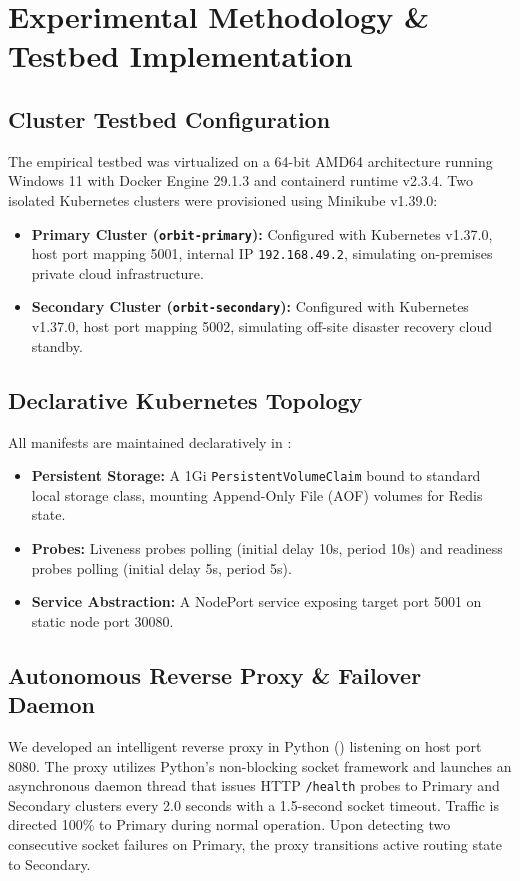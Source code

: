 \documentclass[conference]{IEEEtran}
\begin{document}
\section{Experimental Methodology \& Testbed Implementation}

\subsection{Cluster Testbed Configuration}
The empirical testbed was virtualized on a 64-bit AMD64 architecture running Windows 11 with Docker Engine 29.1.3 and containerd runtime v2.3.4. Two isolated Kubernetes clusters were provisioned using Minikube v1.39.0:
\begin{itemize}
    \item \textbf{Primary Cluster (\texttt{orbit-primary}):} Configured with Kubernetes v1.37.0, host port mapping 5001, internal IP \texttt{192.168.49.2}, simulating on-premises private cloud infrastructure.
    \item \textbf{Secondary Cluster (\texttt{orbit-secondary}):} Configured with Kubernetes v1.37.0, host port mapping 5002, simulating off-site disaster recovery cloud standby.
\end{itemize}

\subsection{Declarative Kubernetes Topology}
All manifests are maintained declaratively in :
\begin{itemize}
    \item \textbf{Persistent Storage:} A 1Gi \texttt{PersistentVolumeClaim} bound to standard local storage class, mounting Append-Only File (AOF) volumes for Redis state.
    \item \textbf{Probes:} Liveness probes polling  (initial delay 10s, period 10s) and readiness probes polling  (initial delay 5s, period 5s).
    \item \textbf{Service Abstraction:} A NodePort service exposing target port 5001 on static node port 30080.
\end{itemize}

\subsection{Autonomous Reverse Proxy \& Failover Daemon}
We developed an intelligent reverse proxy in Python () listening on host port 8080. The proxy utilizes Python's non-blocking socket framework and launches an asynchronous daemon thread that issues HTTP \texttt{/health} probes to Primary and Secondary clusters every 2.0 seconds with a 1.5-second socket timeout. Traffic is directed 100\% to Primary during normal operation. Upon detecting two consecutive socket failures on Primary, the proxy transitions active routing state to Secondary.
\end{document}
